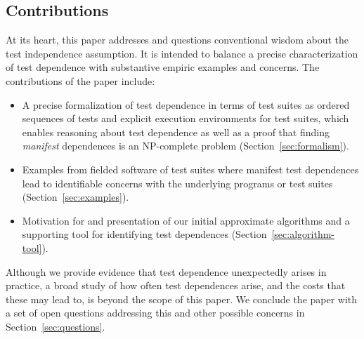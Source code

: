 \subsection{Contributions}

At its heart, this paper addresses and questions conventional wisdom about the
test independence assumption.  It is intended to balance a precise 
characterization of test dependence with substantive empiric examples and concerns. The contributions of the paper include:
\begin{itemize}
  \item A precise formalization of test dependence in terms of test suites as ordered sequences
  of tests and explicit execution environments for test suites, which enables reasoning about test dependence
  as well as a proof that finding \emph{manifest} dependences is an NP-complete
  problem (Section~\ref{sec:formalism}).
  \item Examples from fielded software of test suites where manifest test
  dependences lead to identifiable concerns with the underlying programs or test suites (Section~\ref{sec:examples}).
  \item Motivation for and presentation of our initial approximate algorithms and a supporting tool for identifying test dependences (Section~\ref{sec:algorithm-tool}).
\end{itemize}

Although we provide evidence that test dependence unexpectedly arises in practice,  
a broad
study of how often test dependences arise, and the costs that these may lead to,
is beyond the scope of this paper. 
We conclude the paper with a set of open questions addressing this and
other possible concerns in Section~\ref{sec:questions}.

%
%


